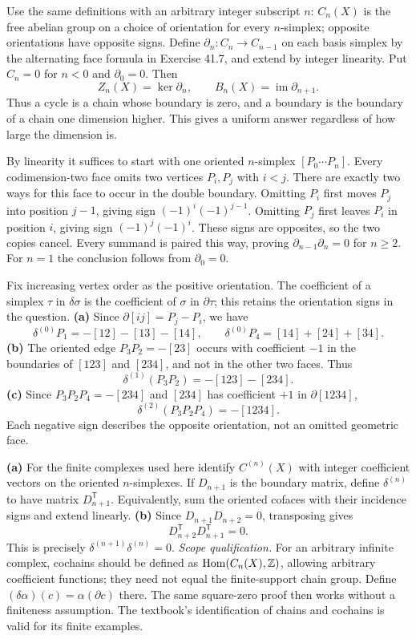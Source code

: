 Use the same definitions with an arbitrary integer subscript $n$:
$C_n(X)$ is the free abelian group on a choice of orientation for every $n$-simplex; opposite orientations have opposite signs. Define $\partial_n:C_n\to C_{n-1}$ on each basis simplex by the alternating face formula in Exercise 41.7, and extend by integer linearity. Put $C_n=0$ for $n<0$ and $\partial_0=0$.
Then
\[
Z_n(X)=\ker\partial_n,\qquad
B_n(X)=\operatorname{im}\partial_{n+1}.
\]
Thus a cycle is a chain whose boundary is zero, and a boundary is the boundary of a chain one dimension higher. This gives a uniform answer regardless of how large the dimension is.

By linearity it suffices to start with one oriented $n$-simplex $[P_0\cdots P_n]$. Every codimension-two face omits two vertices $P_i,P_j$ with $i<j$.
There are exactly two ways for this face to occur in the double boundary. Omitting $P_i$ first moves $P_j$ into position $j-1$, giving sign $(-1)^i(-1)^{j-1}$.
Omitting $P_j$ first leaves $P_i$ in position $i$, giving sign $(-1)^j(-1)^i$.
These signs are opposites, so the two copies cancel. Every summand is paired this way, proving $\partial_{n-1}\partial_n=0$ for $n\ge2$. For $n=1$ the conclusion follows from $\partial_0=0$.

Fix increasing vertex order as the positive orientation. The coefficient of a simplex $\tau$ in $\delta\sigma$ is the coefficient of $\sigma$ in $\partial\tau$; this retains the orientation signs in the question.
\textbf{(a)} Since $\partial[ij]=P_j-P_i$, we have
\[
\delta^{(0)}P_1=-[12]-[13]-[14],\qquad
\delta^{(0)}P_4=[14]+[24]+[34].
\]
\textbf{(b)} The oriented edge $P_3P_2=-[23]$ occurs with coefficient $-1$ in the boundaries of $[123]$ and $[234]$, and not in the other two faces. Thus
\[
\delta^{(1)}(P_3P_2)=-[123]-[234].
\]
\textbf{(c)} Since $P_3P_2P_4=-[234]$ and $[234]$ has coefficient $+1$ in $\partial[1234]$,
\[
\delta^{(2)}(P_3P_2P_4)=-[1234].
\]
Each negative sign describes the opposite orientation, not an omitted geometric face.

\textbf{(a)} For the finite complexes used here identify $C^{(n)}(X)$ with integer coefficient vectors on the oriented $n$-simplexes. If $D_{n+1}$ is the boundary matrix, define $\delta^{(n)}$ to have matrix $D_{n+1}^{\mathsf T}$. Equivalently, sum the oriented cofaces with their incidence signs and extend linearly.
\textbf{(b)} Since $D_{n+1}D_{n+2}=0$, transposing gives
\[
D_{n+2}^{\mathsf T}D_{n+1}^{\mathsf T}=0.
\]
This is precisely $\delta^{(n+1)}\delta^{(n)}=0$.
\emph{Scope qualification.} For an arbitrary infinite complex, cochains should be defined as $\operatorname{Hom}(C_n(X),\mathbb{Z})$, allowing arbitrary coefficient functions; they need not equal the finite-support chain group. Define $(\delta\alpha)(c)=\alpha(\partial c)$ there. The same square-zero proof then works without a finiteness assumption. The textbook's identification of chains and cochains is valid for its finite examples.

